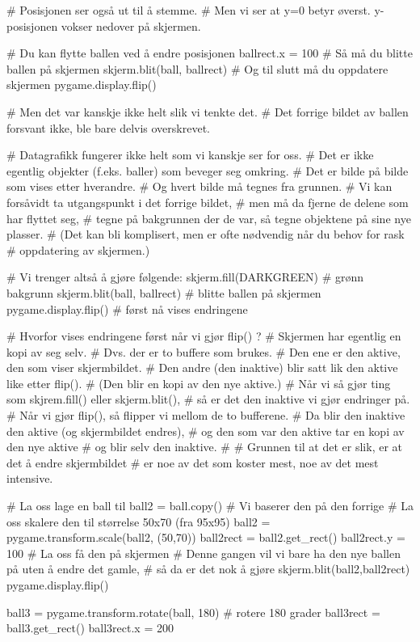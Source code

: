 \documentclass[a4paper,11pt,utf8]{book}
\begin{document}
# Posisjonen ser også ut til å stemme.
# Men vi ser at y=0 betyr øverst. y-posisjonen vokser nedover på skjermen. 


# Du kan flytte ballen ved å endre posisjonen
ballrect.x = 100
# Så må du blitte ballen på skjermen 
skjerm.blit(ball, ballrect)
# Og til slutt må du oppdatere skjermen 
pygame.display.flip()

# Men det var kanskje ikke helt slik vi tenkte det.
# Det forrige bildet av ballen forsvant ikke, ble bare delvis overskrevet.

# Datagrafikk fungerer ikke helt som vi kanskje ser for oss. 
# Det er ikke egentlig objekter (f.eks. baller) som beveger seg omkring. 
# Det er bilde på bilde som vises etter hverandre. 
# Og hvert bilde må tegnes fra grunnen.
# Vi kan forsåvidt ta utgangspunkt i det forrige bildet,
# men må da fjerne de delene som har flyttet seg,
# tegne på bakgrunnen der de var, så tegne objektene på sine nye plasser.
# (Det kan bli komplisert, men er ofte nødvendig når du behov for rask
# oppdatering av skjermen.)

# Vi trenger altså å gjøre følgende:
skjerm.fill(DARKGREEN)       # grønn bakgrunn
skjerm.blit(ball, ballrect)  # blitte ballen på skjermen
pygame.display.flip()        # først nå vises endringene

# Hvorfor vises endringene først når vi gjør flip() ?
# Skjermen har egentlig en kopi av seg selv.
# Dvs. der er to buffere som brukes.
# Den ene er den aktive, den som viser skjermbildet.
# Den andre (den inaktive) blir satt lik den aktive like etter flip().
# (Den blir en kopi av den nye aktive.) 
# Når vi så gjør ting som skjrem.fill() eller skjerm.blit(),
# så er det den inaktive vi gjør endringer på.
# Når vi gjør flip(), så flipper vi mellom de to bufferene. 
# Da blir den inaktive den aktive (og skjermbildet endres), 
# og den som var den aktive tar en kopi av den nye aktive
# og blir selv den inaktive.
# 
# Grunnen til at det er slik, er at det å endre skjermbildet
# er noe av det som koster mest, noe av det mest intensive. 


# La oss lage en ball til 
ball2 = ball.copy()  # Vi baserer den på den forrige
# La oss skalere den til størrelse 50x70 (fra 95x95)
ball2 = pygame.transform.scale(ball2, (50,70))
ball2rect = ball2.get_rect()
ball2rect.y = 100
# La oss få den på skjermen
# Denne gangen vil vi bare ha den nye ballen på uten å endre det gamle,
# så da er det nok å gjøre
skjerm.blit(ball2,ball2rect)
pygame.display.flip()


ball3 = pygame.transform.rotate(ball, 180)  # rotere 180 grader
ball3rect = ball3.get_rect()
ball3rect.x = 200
\end{document}
